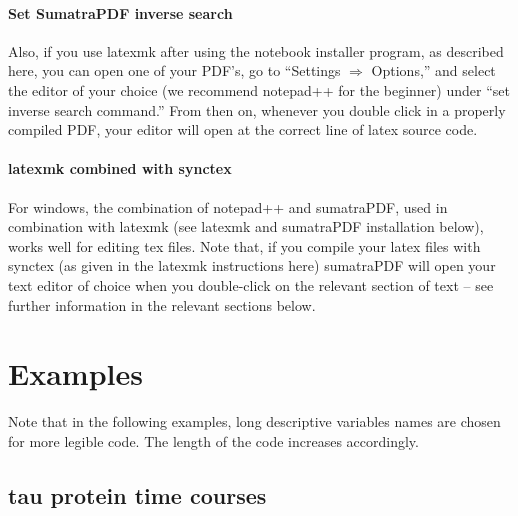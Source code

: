 \paragraph{Set SumatraPDF inverse search}
Also, if you use latexmk after using the notebook installer program,
    as described here,
    you can open one of your PDF's, go to
    ``Settings $\Rightarrow$ Options,''
    and select the editor of your choice
    (we recommend notepad++ for the beginner)
    under ``set inverse search command.''
From then on, whenever you double click in a properly compiled PDF,
    your editor will open at the correct line of latex source code.
\paragraph{latexmk combined with synctex}
For windows, the combination of notepad++ and sumatraPDF,
    used in combination with latexmk (see latexmk and
    sumatraPDF installation below),
    works well for editing tex files.
Note that, if you compile your latex files with synctex 
    (as given in the latexmk instructions here)
    sumatraPDF will open your text editor of choice when you double-click
    on the relevant section of text -- see further information
    in the relevant sections below.
\section{Examples}\label{sec:writeup_software_examples}
Note that in the following examples, long descriptive variables names are chosen for more legible code.
The length of the code increases accordingly.
\subsection{tau protein time courses}
